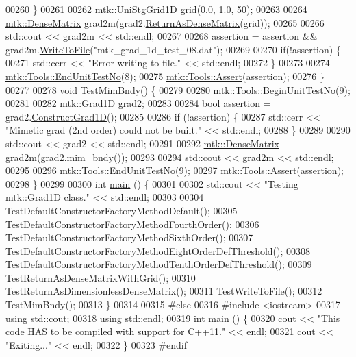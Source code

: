 \begin{DoxyCode}
00260   \}
00261 
00262   \hyperlink{classmtk_1_1UniStgGrid1D}{mtk::UniStgGrid1D} grid(0.0, 1.0, 50);
00263 
00264   \hyperlink{classmtk_1_1DenseMatrix}{mtk::DenseMatrix} grad2m(grad2.\hyperlink{classmtk_1_1Grad1D_a77b2eddbe4ab03f469306c604d505b1a}{ReturnAsDenseMatrix}(grid));
00265 
00266   std::cout << grad2m << std::endl;
00267 
00268   assertion = assertion && grad2m.\hyperlink{classmtk_1_1DenseMatrix_ab396804fb5f188e1eaa8578c738c59fc}{WriteToFile}(\textcolor{stringliteral}{"mtk\_grad\_1d\_test\_08.dat"});
00269 
00270   \textcolor{keywordflow}{if}(!assertion) \{
00271     std::cerr << \textcolor{stringliteral}{"Error writing to file."} << std::endl;
00272   \}
00273 
00274   \hyperlink{classmtk_1_1Tools_aba67d9dc35c9c1c49430fcc9ea035e03}{mtk::Tools::EndUnitTestNo}(8);
00275   \hyperlink{classmtk_1_1Tools_ac6804df469c94ab6a796fb64f1e44a89}{mtk::Tools::Assert}(assertion);
00276 \}
00277 
00278 \textcolor{keywordtype}{void} TestMimBndy() \{
00279 
00280   \hyperlink{classmtk_1_1Tools_afc29ecaf337a13ed2e817d3890a5a441}{mtk::Tools::BeginUnitTestNo}(9);
00281 
00282   \hyperlink{classmtk_1_1Grad1D}{mtk::Grad1D} grad2;
00283 
00284   \textcolor{keywordtype}{bool} assertion = grad2.\hyperlink{classmtk_1_1Grad1D_a74ef5245cfae6fd158bd7f563a0c2e52}{ConstructGrad1D}();
00285 
00286   \textcolor{keywordflow}{if} (!assertion) \{
00287     std::cerr << \textcolor{stringliteral}{"Mimetic grad (2nd order) could not be built."} << std::endl;
00288   \}
00289 
00290   std::cout << grad2 << std::endl;
00291 
00292   \hyperlink{classmtk_1_1DenseMatrix}{mtk::DenseMatrix} grad2m(grad2.\hyperlink{classmtk_1_1Grad1D_ab25e1d064a5a00fbe3777e65fd5750c0}{mim\_bndy}());
00293 
00294   std::cout << grad2m << std::endl;
00295 
00296   \hyperlink{classmtk_1_1Tools_aba67d9dc35c9c1c49430fcc9ea035e03}{mtk::Tools::EndUnitTestNo}(9);
00297   \hyperlink{classmtk_1_1Tools_ac6804df469c94ab6a796fb64f1e44a89}{mtk::Tools::Assert}(assertion);
00298 \}
00299 
00300 \textcolor{keywordtype}{int} \hyperlink{mtk__grad__1d__test_8cc_ae66f6b31b5ad750f1fe042a706a4e3d4}{main} () \{
00301 
00302   std::cout << \textcolor{stringliteral}{"Testing mtk::Grad1D class."} << std::endl;
00303 
00304   TestDefaultConstructorFactoryMethodDefault();
00305   TestDefaultConstructorFactoryMethodFourthOrder();
00306   TestDefaultConstructorFactoryMethodSixthOrder();
00307   TestDefaultConstructorFactoryMethodEightOrderDefThreshold();
00308   TestDefaultConstructorFactoryMethodTenthOrderDefThreshold();
00309   TestReturnAsDenseMatrixWithGrid();
00310   TestReturnAsDimensionlessDenseMatrix();
00311   TestWriteToFile();
00312   TestMimBndy();
00313 \}
00314 
00315 \textcolor{preprocessor}{#else}
00316 \textcolor{preprocessor}{#include <iostream>}
00317 \textcolor{keyword}{using} std::cout;
00318 \textcolor{keyword}{using} std::endl;
\hypertarget{mtk__grad__1d__test_8cc_source_l00319}{}\hyperlink{mtk__grad__1d__test_8cc_ae66f6b31b5ad750f1fe042a706a4e3d4}{00319} \textcolor{keywordtype}{int} \hyperlink{mtk__grad__1d__test_8cc_ae66f6b31b5ad750f1fe042a706a4e3d4}{main} () \{
00320   cout << \textcolor{stringliteral}{"This code HAS to be compiled with support for C++11."} << endl;
00321   cout << \textcolor{stringliteral}{"Exiting..."} << endl;
00322 \}
00323 \textcolor{preprocessor}{#endif}
\end{DoxyCode}
